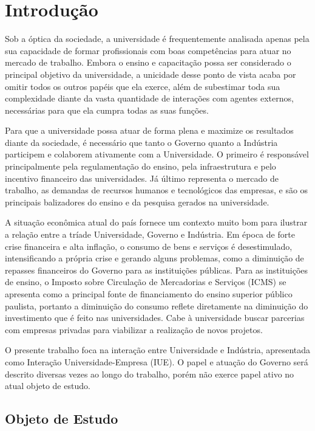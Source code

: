 \chapter[Introdução]{Introdução}
\label{chap:introducao}

Sob a óptica da sociedade, a universidade é frequentemente analisada apenas pela sua capacidade de formar profissionais com boas competências para atuar no mercado de trabalho. Embora o ensino e capacitação possa ser considerado o principal objetivo da universidade, a unicidade desse ponto de vista acaba por omitir todos os outros papéis que ela exerce, além de subestimar toda sua complexidade diante da vasta quantidade de interações com agentes externos, necessárias para que ela cumpra todas as suas funções.

Para que a universidade possa atuar de forma plena e maximize os resultados diante da sociedade, é necessário que tanto o Governo quanto a Indústria participem e colaborem ativamente com a Universidade. O primeiro é responsável principalmente pela regulamentação do ensino, pela infraestrutura e pelo incentivo financeiro das universidades. Já último representa o mercado de trabalho, as demandas de recursos humanos e tecnológicos das empresas, e são os principais balizadores do ensino e da pesquisa gerados na universidade. 

A situação econômica atual do país fornece um contexto muito bom para ilustrar a relação entre a tríade Universidade, Governo e Indústria. Em época de forte crise financeira e alta inflação, o consumo de bens e serviços é desestimulado, intensificando a própria crise e gerando alguns problemas, como a diminuição de repasses financeiros do Governo para as instituições públicas. Para as instituições de ensino, o Imposto sobre Circulação de Mercadorias e Serviços (ICMS) se apresenta como a principal fonte de financiamento do ensino superior público paulista, portanto a diminuição do consumo reflete diretamente na diminuição do investimento que é feito nas universidades. Cabe à universidade buscar parcerias com empresas privadas para viabilizar a realização de novos projetos.

O presente trabalho foca na interação entre Universidade e Indústria, apresentada como Interação Universidade-Empresa (IUE). O papel e atuação do Governo será descrito diversas vezes ao longo do trabalho, porém não exerce papel ativo no atual objeto de estudo.

\section{Objeto de Estudo}


